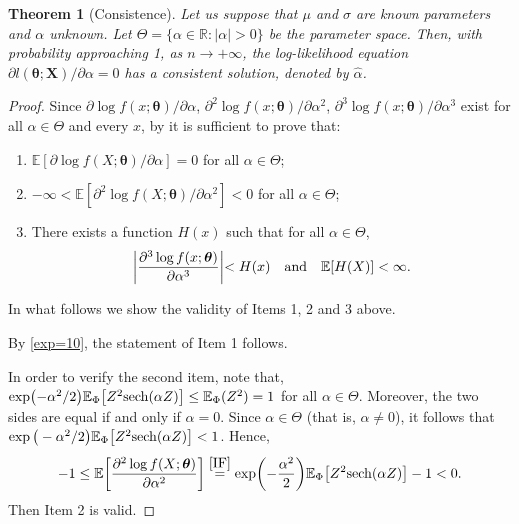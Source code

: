 \documentclass[12pt]{article}
\newtheorem{theorem}{Theorem}[section]
\theoremstyle{definition}
\begin{document}
\begin{theorem}[Consistence]\label{consistence}
Let us suppose that $\mu$ and $\sigma$ are known parameters and $\alpha$ unknown.
Let $\Theta=\{\alpha\in\mathbb{R}:\vert \alpha\vert >0\}$ be the parameter space. Then, with probability approaching 1, as $n\to +\infty$, the log-likelihood equation ${\partial l(\boldsymbol{\theta};\boldsymbol{X})/ \partial \alpha }= 0$ has a consistent solution, denoted by $\widehat{\alpha}$.
\end{theorem}
\begin{proof}
Since ${\partial \log f(x;\boldsymbol{\theta})/ \partial \alpha }$, ${\partial^2 \log f(x;\boldsymbol{\theta})/ \partial \alpha^2 }$, ${\partial^3 \log f(x;\boldsymbol{\theta})/ \partial \alpha^3 }$ exist for all $\alpha\in\Theta$ and every $x$, by \cite{cra:46} it is sufficient to prove that:
\begin{enumerate}
	\item $\mathbb{E}[{\partial \log f(X;\boldsymbol{\theta})/ \partial \alpha }]=0$ for all $\alpha\in\Theta$;
	\item $-\infty<\mathbb{E}[{\partial^2 \log f(X;\boldsymbol{\theta})/ \partial \alpha^2 }]<0$ for all $\alpha\in\Theta$;
	\item There exists a function $H(x)$ such that for all $\alpha\in\Theta$,
	\begin{align*}
	\biggl\vert {\partial^3 \log f(x;\boldsymbol{\theta})\over \partial \alpha^3 }\biggl\vert <H(x) 
	\quad \text{and}\quad 
	\mathbb{E}[H(X)]<\infty.
	\end{align*}
\end{enumerate}

In what follows we show the validity of Items 1, 2 and 3 above.

By \eqref{exp=10}, the statement of Item 1 follows.

In order to verify the second item,
note that, 
$\exp\bigl(-{\alpha^2/ 2}\bigr)\mathbb{E}_{\Phi}
\big[Z^2{\rm sech}(\alpha Z)\big]\leq \mathbb{E}_{\Phi}(Z^2)=1$ for all $\alpha\in\Theta$.
Moreover, the two sides are equal if and only if $\alpha=0$. Since $\alpha\in\Theta$ (that is, $\alpha\neq 0$), it follows that
$\exp\big(-{\alpha^2/ 2}\big)\mathbb{E}_{\Phi}
\big[Z^2{\rm sech}(\alpha Z)\big]<1$. Hence,
%
\begin{align}\label{exp-finite}
-1\leq 
\mathbb{E}\biggl[{\partial^2 \log f(X;\boldsymbol{\theta})\over \partial \alpha^2 }\biggr]
\stackrel{\eqref{IF}}{=}
\exp\biggl(-{\alpha^2\over 2}\biggr)\mathbb{E}_{\Phi}
\big[Z^2{\rm sech}(\alpha Z)\big]-1
<0.
\end{align}
Then Item 2 is valid.


\end{proof}
\end{document}
